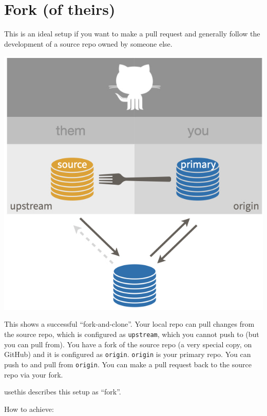 \documentclass[
]{book}
\begin{document}
\section{Fork (of theirs)}\label{fork-them}

This is an ideal setup if you want to make a pull request and generally follow the development of a source repo owned by someone else.

\begin{center}\includegraphics[width=0.6\linewidth]{img/fork-them} \end{center}

This shows a successful ``fork-and-clone''.
Your local repo can pull changes from the source repo, which is configured as \texttt{upstream}, which you cannot push to (but you can pull from).
You have a fork of the source repo (a very special copy, on GitHub) and it is configured as \texttt{origin}.
\texttt{origin} is your primary repo.
You can push to and pull from \texttt{origin}.
You can make a pull request back to the source repo via your fork.

usethis describes this setup as ``fork''.

How to achieve:
\end{document}
